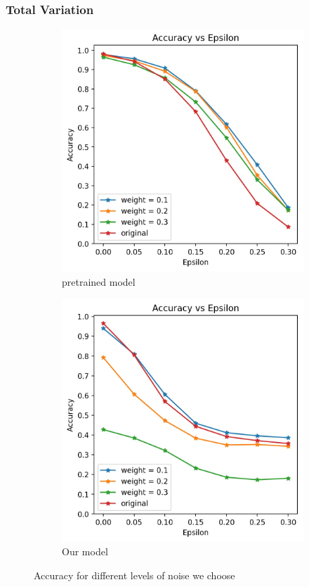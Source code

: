 \subsubsection{Total Variation}
\begin{figure}[h!]
	\centering
	\begin{subfigure}{.4\textwidth}
		\includegraphics[width=\textwidth]{pretrained_Accuracy_vs_Epsilon_tv.jpg}
		\caption{pretrained model}
		\label{fig: tv pre}
	\end{subfigure}
	\begin{subfigure}{.4\textwidth}
		\includegraphics[width=\textwidth]{Accuracy_vs_Epsilon_tv.jpg}
		\caption{Our model}
		\label{fig: tv us}
	\end{subfigure}
	\caption{Accuracy for different levels of noise we choose}
\end{figure}